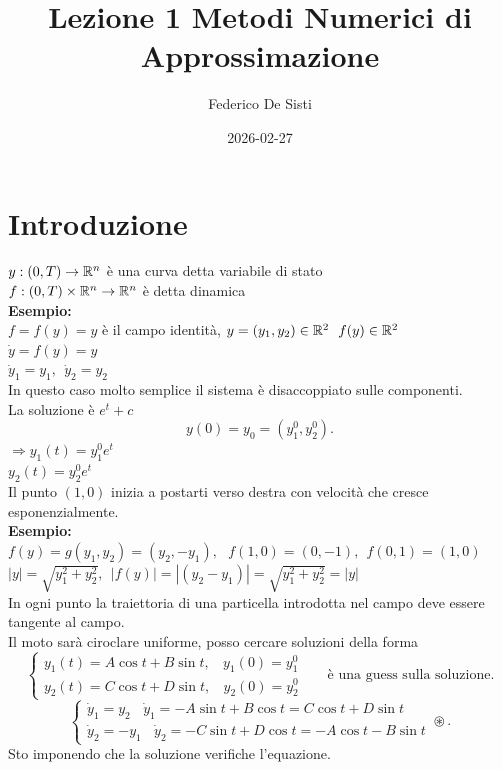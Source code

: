 \documentclass[12px]{article}
\title{Lezione 1 Metodi Numerici di Approssimazione}
\date{2026-02-27}
\author{Federico De Sisti}
\begin{document}
	\maketitle
	\newpage
	\section{Introduzione}
	$y:(0,T)  \rightarrow\mathbb{R}^n$  è una curva detta variabile di stato\\
	$f:(0,T)\times \mathbb{R}^n \rightarrow \mathbb{R}^n$ è detta dinamica\\

	\textbf{Esempio:}\\
	$f = f(y) = y$ è il campo identità,  $y = (y_1,y_2)\in\R^2 \ \ f(y)\in \R^2$\\
	$\dot y = f(y) = y$\\
	 $\dot y_1 = y_1, \ \ \dot y_2 = y_2$\\
	 In questo caso molto semplice il sistema è disaccoppiato sulle componenti.\\
	 La soluzione è $e^t + c$\\
	 \[
	 y(0) = y_0 = (y_1^0, y_2^0)
	 .\] 
	 $ \Rightarrow  y_1(t) = y_1^0e^t$\\
	 $  y_2(t) = y_2^0e^t$\\
	 Il punto $(1,0)$ inizia a postarti verso destra con velocità che cresce esponenzialmente.\\
\textbf{Esempio:}\\
$f(y) = g(y_1,y_2)= (y_2,-y_1), \ \ \ f(1,0) = (0,-1), \ \ f(0,1) = (1,0)$\\
$|y| = \sqrt{y_1^2 + y_2^2}, \ \ |f(y)| = |(y_2-y_1)| = \sqrt{y_1^2 + y_2^2} = |y|$\\
In ogni punto la traiettoria di una particella introdotta nel campo deve essere tangente al campo.\\
Il moto sarà ciroclare uniforme, posso cercare soluzioni della forma
\[
\begin{cases}
	y_1(t) = A\cos t + B\sin t, \ \ \ \ y_1(0) = y_1^0\\ 
	y_2(t) = C\cos t + D\sin t, \ \ \ \ y_2(0) = y_2^0 
\end{cases}\ \ \ \ \ \ \text{ è una guess sulla soluzione}
.\] 
\[
\begin{cases}
	\dot y_1 = y_2\ \ \ \ \dot y_1 = -A\sin t + B\cos t = C\cos t + D\sin t\\
	\dot y_2 =- y_1 \ \ \ \ \dot y_2 = -C\sin t + D\cos t = -A\cos t - B\sin t
\end{cases}\circledast
.\]
Sto imponendo che la soluzione verifiche l'equazione.
\end{document}
